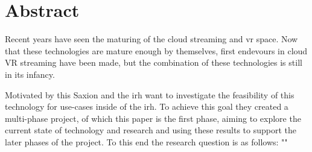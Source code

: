 \section{Abstract}

Recent years have seen the maturing of the cloud streaming and \acrfull{vr} space. Now that these technologies are mature enough by themselves, first endevours in cloud VR streaming have been made, but the combination of these technologies is still in its infancy.

Motivated by this Saxion and the \acrfull{irh} want to investigate the feasibility of this technology for use-cases inside of the \acrshort{irh}. To achieve this goal they created a multi-phase project, of which this paper is the first phase, aiming to explore the current state of technology and research and using these results to support the later phases of the project. To this end the research question is as follows: "\textit{}"

